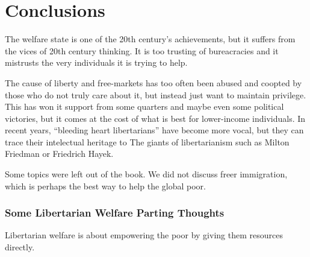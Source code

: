\chapter{Conclusions}

The welfare state is one of the 20th century's achievements, but it suffers
from the vices of 20th century thinking. It is too trusting of bureacracies and
it mistrusts the very individuals it is trying to help.

The cause of liberty and free-markets has too often been abused and coopted by
those who do not truly care about it, but instead just want to maintain
privilege. This has won it support from some quarters and maybe even some
political victories, but it comes at the cost of what is best for lower-income
individuals. In recent years, ``bleeding heart libertarians'' have become more
vocal, but they can trace their intelectual heritage to The giants of
libertarianism such as Milton Friedman or Friedrich Hayek.

Some topics were left out of the book. We did not discuss freer immigration,
which is perhaps the best way to help the global poor.

\subsection{Some Libertarian Welfare Parting Thoughts}

\thought Libertarian welfare is about empowering the poor by giving them
resources directly.


